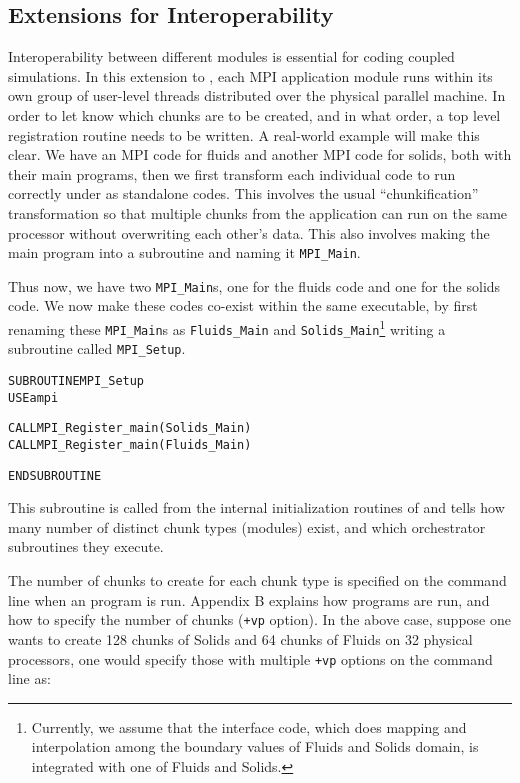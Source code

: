 \documentclass[10pt]{article}
\begin{document}
\subsection{Extensions for Interoperability}

Interoperability between different modules is essential for coding coupled
simulations.  In this extension to \ampi{}, each MPI application module runs
within its own group of user-level threads distributed over the physical
parallel machine.  In order to let \ampi{} know which chunks are to be created,
and in what order, a top level registration routine needs to be written. A
real-world example will make this clear. We have an MPI code for fluids and
another MPI code for solids, both with their main programs, then we first
transform each individual code to run correctly under \ampi{} as standalone
codes. This involves the usual ``chunkification'' transformation so that
multiple chunks from the application can run on the same processor without
overwriting each other's data. This also involves making the main program into
a subroutine and naming it \texttt{MPI\_Main}.

Thus now, we have two \texttt{MPI\_Main}s, one for the fluids code and one for
the solids code. We now make these codes co-exist within the same executable,
by first renaming these \texttt{MPI\_Main}s as \texttt{Fluids\_Main} and
\texttt{Solids\_Main}\footnote{Currently, we assume that the interface code,
which does mapping and interpolation among the boundary values of Fluids and
Solids domain, is integrated with one of Fluids and Solids.} writing a
subroutine called \texttt{MPI\_Setup}.

\begin{alltt}
SUBROUTINE MPI_Setup
  USE ampi

  CALL MPI_Register_main(Solids_Main)
  CALL MPI_Register_main(Fluids_Main)

END SUBROUTINE
\end{alltt}

This subroutine is called from the internal initialization routines of \ampi{}
and tells \ampi{} how many number of distinct chunk types (modules) exist, and
which orchestrator subroutines they execute.

The number of chunks to create for each chunk type is specified on the command
line when an \ampi{} program is run. Appendix B explains how \ampi{} programs
are run, and how to specify the number of chunks (\verb|+vp| option). In the
above case, suppose one wants to create 128 chunks of Solids and 64 chunks of
Fluids on 32 physical processors, one would specify those with multiple
\verb|+vp| options on the command line as:
\end{document}
